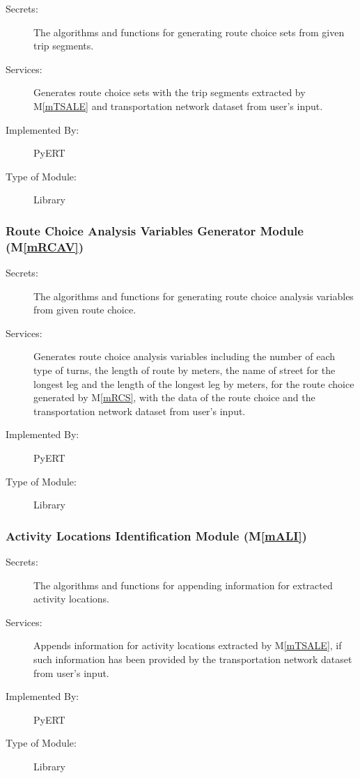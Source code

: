 \documentclass[12pt, titlepage]{article}
\newcommand{\mref}[1]{M\ref{#1}}
\begin{document}
\begin{description}
\item[Secrets:]The algorithms and functions for generating route choice sets from given trip segments.
\item[Services:]Generates route choice sets with the trip segments extracted by \mref{mTSALE} and transportation network dataset from user's input.
\item[Implemented By:] PyERT
\item[Type of Module:] Library
\end{description}

\subsubsection{Route Choice Analysis Variables Generator Module (\mref{mRCAV})}

\begin{description}
\item[Secrets:]The algorithms and functions for generating route choice analysis variables from given route choice.
\item[Services:]Generates route choice analysis variables including the number of each type of turns, the length of route by meters, the name of street for the longest leg and the length of the longest leg by meters, for the route choice generated by \mref{mRCS}, with the data of the route choice and the transportation network dataset from user's input.
\item[Implemented By:] PyERT
\item[Type of Module:] Library
\end{description}

\subsubsection{Activity Locations Identification Module (\mref{mALI})}

\begin{description}
\item[Secrets:]The algorithms and functions for appending information for extracted activity locations.
\item[Services:]Appends information for activity locations extracted by \mref{mTSALE}, if such information has been provided by the transportation network dataset from user's input.
\item[Implemented By:] PyERT
\item[Type of Module:] Library
\end{description}
\end{document}
